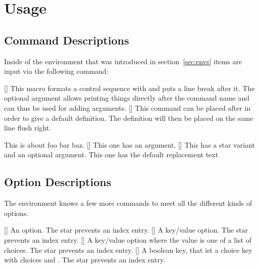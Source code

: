 \documentclass[load-preamble]{cnltx-doc}
\begin{document}
\section{Usage}
\subsection{Command Descriptions}\label{sec:usage:commands}
Inside of the environment  that was introduced in
section~\ref{sec:envs} items are input via the following command:
\begin{commands}
  [\sarg{}]
    This macro formats a control sequence with  and puts a line break
    after it.  The optional argument allows printing things directly after the
    command name and can thus be used for adding arguments.
  []
    This command can be placed after  in order to give a default
    definition.  The definition will then be placed on the same line flush
    right.
\end{commands}
\begin{example}
  \begin{commands}
      This is about foo bar baz.
    []
      This one has an argument.
    [\sarg{}]
      This has a star variant and an optional argument.
      This one has the default replacement text 
  \end{commands}
\end{example}

\subsection{Option Descriptions}\label{sec:usage:options}

The  environment knows a few more commands to meet all the
different kinds of options.
\begin{commands}
  [\sarg]
    An option.  The star prevents an index entry.
  [\sarg{}]
    A key/value option.  The star prevents an index entry.
  [\sarg{}]
    A key/value option where the value is one of a list of choices.  The star
    prevents an index entry.
  [\sarg{}]
    A boolean key, that ist a choice key with choices  and 
    .  The star prevents an index entry.
\end{commands}
\end{document}
